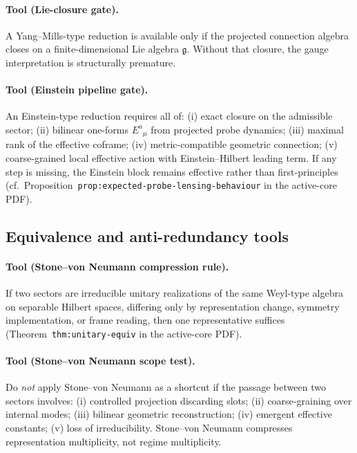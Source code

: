 \paragraph{Tool (Lie-closure gate).}
A Yang--Mills-type reduction is available only if the projected
connection algebra closes on a finite-dimensional Lie algebra
$\mathfrak{g}$. Without that closure, the gauge interpretation is
structurally premature.

\paragraph{Tool (Einstein pipeline gate).}
An Einstein-type reduction requires all of: (i) exact closure on the
admissible sector; (ii) bilinear one-forms $E^a{}_\mu$ from projected
probe dynamics; (iii) maximal rank of the effective coframe; (iv)
metric-compatible geometric connection; (v) coarse-grained local
effective action with Einstein--Hilbert leading term. If any step is
missing, the Einstein block remains effective rather than
first-principles
(cf.\ Proposition~\texttt{prop:expected-probe-lensing-behaviour} in the active-core PDF).

\subsection*{Equivalence and anti-redundancy tools}

\paragraph{Tool (Stone--von Neumann compression rule).}
If two sectors are irreducible unitary realizations of the same
Weyl-type algebra on separable Hilbert spaces, differing only by
representation change, symmetry implementation, or frame reading, then
one representative suffices
(Theorem~\texttt{thm:unitary-equiv} in the active-core PDF).

\paragraph{Tool (Stone--von Neumann scope test).}
Do \emph{not} apply Stone--von Neumann as a shortcut if the passage
between two sectors involves: (i) controlled projection discarding
slots; (ii) coarse-graining over internal modes; (iii) bilinear
geometric reconstruction; (iv) emergent effective constants; (v) loss
of irreducibility. Stone--von Neumann compresses representation
multiplicity, not regime multiplicity.

